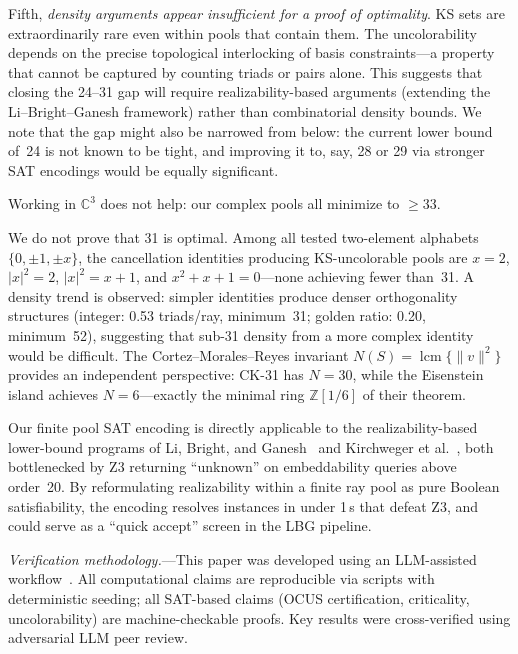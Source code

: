 \documentclass[twocolumn,prl,superscriptaddress,nofootinbib]{revtex4-2}
\newcommand{\C}{\mathbb{C}}
\newcommand{\Z}{\mathbb{Z}}
\begin{document}
Fifth, \emph{density arguments appear insufficient for a proof of optimality}. KS sets are extraordinarily rare even within pools that contain them. The uncolorability depends on the precise topological interlocking of basis constraints---a property that cannot be captured by counting triads or pairs alone. This suggests that closing the 24--31 gap will require realizability-based arguments (extending the Li--Bright--Ganesh framework) rather than combinatorial density bounds.  We note that the gap might also be narrowed from below: the current lower bound of~24 is not known to be tight, and improving it to, say, 28 or 29 via stronger SAT encodings would be equally significant.

Working in $\C^3$ does not help: our complex pools all minimize to $\geq 33$.

We do not prove that 31 is optimal.  Among all tested two-element alphabets $\{0, \pm 1, \pm x\}$, the cancellation identities producing KS-uncolorable pools are $x = 2$, $|x|^2 = 2$, $|x|^2 = x+1$, and $x^2+x+1=0$---none achieving fewer than~31.  A density trend is observed: simpler identities produce denser orthogonality structures (integer: 0.53 triads/ray, minimum~31; golden ratio: 0.20, minimum~52), suggesting that sub-31 density from a more complex identity would be difficult.  The Cortez--Morales--Reyes invariant $N(S) = \operatorname{lcm}\{\|v\|^2\}$~\cite{CortezMoralesReyes2022} provides an independent perspective: CK-31 has $N = 30$, while the Eisenstein island achieves $N = 6$---exactly the minimal ring $\Z[1/6]$ of their theorem.

Our finite pool SAT encoding is directly applicable to the realizability-based lower-bound programs of Li, Bright, and Ganesh~\cite{LiBrightGanesh2024} and Kirchweger et al.~\cite{KirchwegarPeitlSzeider2023}, both bottlenecked by Z3 returning ``unknown'' on embeddability queries above order~20.  By reformulating realizability within a finite ray pool as pure Boolean satisfiability, the encoding resolves instances in under 1\,s that defeat Z3, and could serve as a ``quick accept'' screen in the LBG pipeline.

\textit{Verification methodology.}---This paper was developed using an LLM-assisted workflow~\cite{Schwartz2026}.  All computational claims are reproducible via scripts with deterministic seeding; all SAT-based claims (OCUS certification, criticality, uncolorability) are machine-checkable proofs.  Key results were cross-verified using adversarial LLM peer review.
\end{document}
